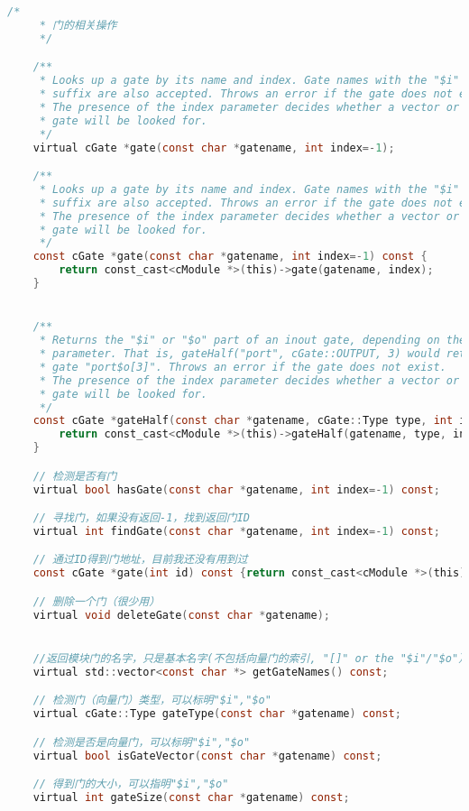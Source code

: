 \begin{lstlisting}[language=c]
    /*
     * 门的相关操作
     */

    /**
     * Looks up a gate by its name and index. Gate names with the "$i" or "$o"
     * suffix are also accepted. Throws an error if the gate does not exist.
     * The presence of the index parameter decides whether a vector or a scalar
     * gate will be looked for.
     */
    virtual cGate *gate(const char *gatename, int index=-1);

    /**
     * Looks up a gate by its name and index. Gate names with the "$i" or "$o"
     * suffix are also accepted. Throws an error if the gate does not exist.
     * The presence of the index parameter decides whether a vector or a scalar
     * gate will be looked for.
     */
    const cGate *gate(const char *gatename, int index=-1) const {
        return const_cast<cModule *>(this)->gate(gatename, index);
    }


    /**
     * Returns the "$i" or "$o" part of an inout gate, depending on the type
     * parameter. That is, gateHalf("port", cGate::OUTPUT, 3) would return
     * gate "port$o[3]". Throws an error if the gate does not exist.
     * The presence of the index parameter decides whether a vector or a scalar
     * gate will be looked for.
     */
    const cGate *gateHalf(const char *gatename, cGate::Type type, int index=-1) const {
        return const_cast<cModule *>(this)->gateHalf(gatename, type, index);
    }

    // 检测是否有门
    virtual bool hasGate(const char *gatename, int index=-1) const;

    // 寻找门，如果没有返回-1，找到返回门ID
    virtual int findGate(const char *gatename, int index=-1) const;

    // 通过ID得到门地址，目前我还没有用到过
    const cGate *gate(int id) const {return const_cast<cModule *>(this)->gate(id);}

    // 删除一个门（很少用）
    virtual void deleteGate(const char *gatename);


    //返回模块门的名字，只是基本名字(不包括向量门的索引, "[]" or the "$i"/"$o"）
    virtual std::vector<const char *> getGateNames() const;

    // 检测门（向量门）类型，可以标明"$i","$o"
    virtual cGate::Type gateType(const char *gatename) const;

    // 检测是否是向量门，可以标明"$i","$o"
    virtual bool isGateVector(const char *gatename) const;

    // 得到门的大小，可以指明"$i","$o"
    virtual int gateSize(const char *gatename) const;


\end{lstlisting}
